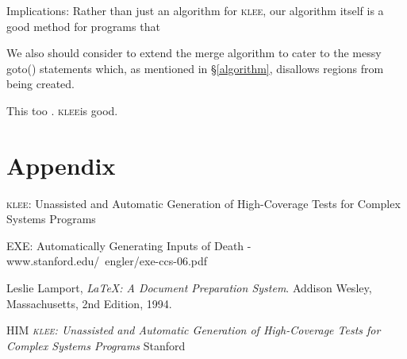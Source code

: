 \documentclass[12pt,a4paper]{article}
\newcommand{\klee}{\textsc{klee}}
\begin{document}
Implications: Rather than just an algorithm for \klee, our algorithm itself is a good method for programs that 

We also should consider to extend the merge algorithm to cater to the messy goto() statements which, as mentioned in \S\ref{algorithm}, disallows regions from being created. \cite{lamport94}

This too \cite{boom}. \klee is good.

\section{Appendix}
\klee: Unassisted and Automatic Generation of High-Coverage Tests for Complex Systems Programs

%
%
EXE: Automatically Generating Inputs of Death - www.stanford.edu/~engler/exe-ccs-06.pdf

\begin{thebibliography}{9}

         Leslie Lamport,
          \emph{\LaTeX: A Document Preparation System}.
	  Addison Wesley, Massachusetts,
	  2nd Edition,
	  1994.

         HIM
         \emph{\textsc{klee}: Unassisted and Automatic Generation of High-Coverage Tests for Complex Systems Programs}
         Stanford
\end{thebibliography}
\end{document}
